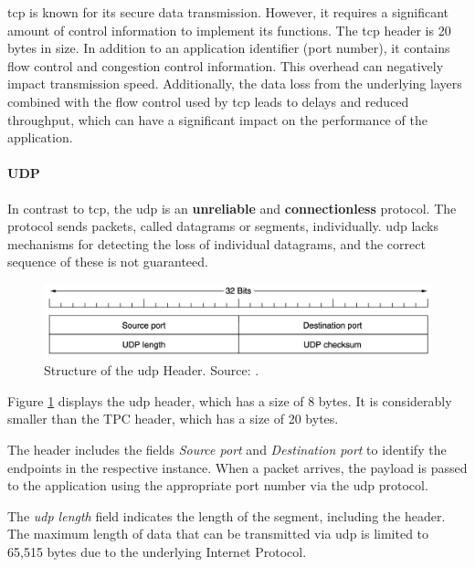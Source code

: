 \ac{tcp} is known for its secure data transmission. However, it requires a significant amount of control information to implement its functions. The \ac{tcp} header is 20 bytes in size. In addition to an application identifier (port number), it contains flow control and congestion control information. This overhead can negatively impact transmission speed. Additionally, the data loss from the underlying layers combined with the flow control used by \ac{tcp} leads to delays and reduced throughput, which can have a significant impact on the performance of the application.

\paragraph{UDP}

In contrast to \ac{tcp}, the \acf{udp} is an \textbf{unreliable} and \textbf{connectionless} protocol. The protocol sends packets, called datagrams or segments, individually. \ac{udp} lacks mechanisms for detecting the loss of individual datagrams, and the correct sequence of these is not guaranteed.

\begin{figure}[h]
    \centering
    \includegraphics[width=1\linewidth]{figures/tcpip_refmodel/image6.png}
    \caption[Structure of the UDP Header]{Structure of the \ac{udp} Header. Source: \cite{Tanenbaum2010}.}
    \label{fig:UDPHeader}
\end{figure}

Figure \ref{fig:UDPHeader} displays the \ac{udp} header, which has a size of 8 bytes. It is considerably smaller than the TPC header, which has a size of 20 bytes.

The header includes the fields \textit{Source port} and \textit{Destination port} to identify the endpoints in the respective instance. When a packet arrives, the payload is passed to the application using the appropriate port number via the \ac{udp} protocol.

The \textit{\ac{udp} length} field indicates the length of the segment, including the header. The maximum length of data that can be transmitted via \ac{udp} is limited to 65,515 bytes due to the underlying Internet Protocol.

